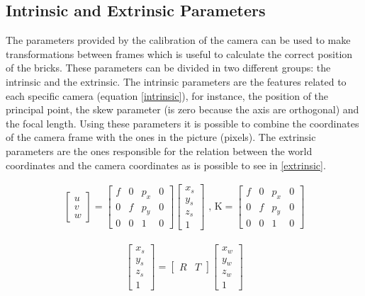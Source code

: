 \subsection{Intrinsic and Extrinsic Parameters}
The parameters provided by the calibration of the camera can be used to make transformations between frames which is useful to calculate the correct position of the bricks. These parameters can be divided in two different groups: the intrinsic and the extrinsic. The intrinsic parameters are the features related to each specific camera (equation \ref{intrinsic}), for instance, the position of the principal point, the skew parameter (is zero because the axis are orthogonal) and the focal length. Using these parameters it is possible to combine the coordinates of the camera frame with the ones in the picture (pixels). The extrinsic parameters are the ones responsible for the relation between the world coordinates and the camera coordinates as is possible to see in \ref{extrinsic}.

\begin{align} 
\label{intrinsic}
\begin{bmatrix}
    \textit{u} \\ 
    \textit{v} \\
    \textit{w} 
\end{bmatrix}
=
\begin{bmatrix}
    \textit{f}  & 0 & p_{x} & 0\\
    0   &  \textit{f} & p_{y} & 0  \\
    0 & 0 & 1 & 0 
\end{bmatrix}
\begin{bmatrix}
   x_{s}\\
   y_{s}\\
   z_{s}\\
	1
\end{bmatrix}
\text{  , K}
=
\begin{bmatrix}
    \textit{f}  & 0 & p_{x} & 0\\
    0   &  \textit{f} & p_{y} & 0  \\
    0 & 0 & 1 & 0 
\end{bmatrix}
\end{align}

\begin{align} 
\label{extrinsic}
\begin{bmatrix}
   x_{s}\\
   y_{s}\\
   z_{s}\\
	1
\end{bmatrix}
=
\begin{bmatrix}
    \textit{R}  & \textit{T}
\end{bmatrix}
\begin{bmatrix}
   x_{w}\\
   y_{w}\\
   z_{w}\\
	1
\end{bmatrix}
\end{align}

